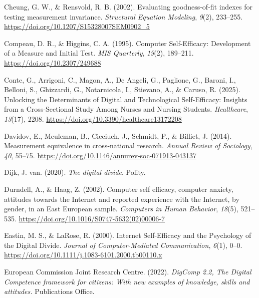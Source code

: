 \documentclass[
  letterpaper,
  DIV=11,
  numbers=noendperiod]{scrartcl}
\newlength{\cslhangindent}
\newenvironment{CSLReferences}[2] %
 {\begin{list}{}{%
  \setlength{\itemindent}{0pt}
  \setlength{\leftmargin}{0pt}
  \setlength{\parsep}{0pt}
  \ifodd #1
   \setlength{\leftmargin}{\cslhangindent}
   \setlength{\itemindent}{-1\cslhangindent}
  \fi
  \setlength{\itemsep}{#2\baselineskip}}}
 {\end{list}}
\begin{document}
\begin{CSLReferences}{1}{0}
Cheung, G. W., \& Rensvold, R. B. (2002). Evaluating goodness-of-fit
indexes for testing measurement invariance. \emph{Structural Equation
Modeling}, \emph{9}(2), 233--255.
\url{https://doi.org/10.1207/S15328007SEM0902_5}

Compeau, D. R., \& Higgins, C. A. (1995). Computer {Self-Efficacy}:
{Development} of a {Measure} and {Initial Test}. \emph{MIS Quarterly},
\emph{19}(2), 189--211. \url{https://doi.org/10.2307/249688}

Conte, G., Arrigoni, C., Magon, A., De Angeli, G., Paglione, G., Baroni,
I., Belloni, S., Ghizzardi, G., Notarnicola, I., Stievano, A., \&
Caruso, R. (2025). Unlocking the {Determinants} of {Digital} and
{Technological Self-Efficacy}: {Insights} from a {Cross-Sectional Study
Among Nurses} and {Nursing Students}. \emph{Healthcare}, \emph{13}(17),
2208. \url{https://doi.org/10.3390/healthcare13172208}

Davidov, E., Meuleman, B., Cieciuch, J., Schmidt, P., \& Billiet, J.
(2014). Measurement equivalence in cross-national research. \emph{Annual
Review of Sociology}, \emph{40}, 55--75.
\url{https://doi.org/10.1146/annurev-soc-071913-043137}

Dijk, J. van. (2020). \emph{The digital divide}. Polity.

Durndell, A., \& Haag, Z. (2002). Computer self efficacy, computer
anxiety, attitudes towards the {Internet} and reported experience with
the {Internet}, by gender, in an {East European} sample. \emph{Computers
in Human Behavior}, \emph{18}(5), 521--535.
\url{https://doi.org/10.1016/S0747-5632(02)00006-7}

Eastin, M. S., \& LaRose, R. (2000). Internet {Self-Efficacy} and the
{Psychology} of the {Digital Divide}. \emph{Journal of Computer-Mediated
Communication}, \emph{6}(1), 0--0.
\url{https://doi.org/10.1111/j.1083-6101.2000.tb00110.x}

European Commission Joint Research Centre. (2022). \emph{{DigComp} 2.2,
{The Digital Competence} framework for citizens: With new examples of
knowledge, skills and attitudes.} Publications Office.


\end{CSLReferences}
\end{document}
